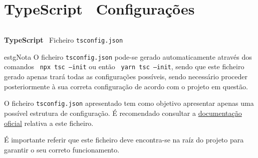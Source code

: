 \section*{\textbf{TypeScript} \textemdash~Configurações}
\label{tsconfigExample}

\begin{longlisting}
	\inputminted{json}{code/typescript/tsconfig.json}
	\caption{\textbf{TypeScript} \textemdash~Ficheiro \texttt{tsconfig.json}}
\end{longlisting}

\begin{mybox}{estg}{Nota}
	O ficheiro \texttt{tsconfig.json} pode-se gerado automaticamente através dos comandos ~\texttt{npx tsc --init} ou então ~\texttt{yarn tsc --init}, sendo que este ficheiro gerado apenas trará todas as configurações possíveis, sendo necessário proceder posteriormente à sua correta configuração de acordo com o projeto em questão.

	\vspace{0.35cm}

	O ficheiro \texttt{tsconfig.json} apresentado tem como objetivo apresentar apenas uma possível estrutura de configuração. É recomendado consultar a \href{https://www.typescriptlang.org/tsconfig}{documentação oficial} relativa a este ficheiro.

	\vspace{0.15cm}

	É importante referir que este ficheiro deve encontra-se na raíz do projeto para garantir o seu correto funcionamento.
\end{mybox}